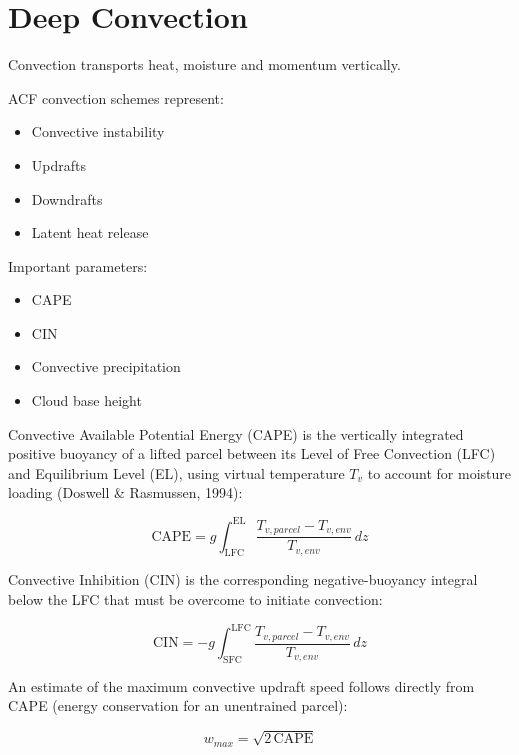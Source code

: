 \section{Deep Convection}


Convection transports heat, moisture and momentum vertically.


ACF convection schemes represent:


\begin{itemize}

\item Convective instability

\item Updrafts

\item Downdrafts

\item Latent heat release

\end{itemize}



Important parameters:


\begin{itemize}

\item CAPE

\item CIN

\item Convective precipitation

\item Cloud base height

\end{itemize}



Convective Available Potential Energy (CAPE) is the vertically integrated
positive buoyancy of a lifted parcel between its Level of Free Convection
(LFC) and Equilibrium Level (EL), using virtual temperature $T_v$ to
account for moisture loading (Doswell \& Rasmussen, 1994):

\begin{equation}
\mathrm{CAPE}
=
g\int_{\mathrm{LFC}}^{\mathrm{EL}}
\frac{T_{v,parcel}-T_{v,env}}{T_{v,env}}
\, dz
\end{equation}


Convective Inhibition (CIN) is the corresponding negative-buoyancy integral
below the LFC that must be overcome to initiate convection:

\begin{equation}
\mathrm{CIN}
=
-g\int_{\mathrm{SFC}}^{\mathrm{LFC}}
\frac{T_{v,parcel}-T_{v,env}}{T_{v,env}}
\, dz
\end{equation}


An estimate of the maximum convective updraft speed follows directly from
CAPE (energy conservation for an unentrained parcel):

\begin{equation}
w_{max} = \sqrt{2\,\mathrm{CAPE}}
\end{equation}
